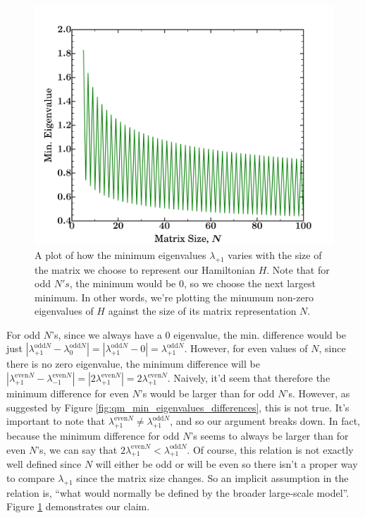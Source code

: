 \documentclass{amsproc}
\theoremstyle{definition}
\theoremstyle{remark}
\numberwithin{equation}{section}
\begin{document}
\begin{figure}
\includegraphics[width=\columnwidth]{figures/qm_min_eigenvalues.pdf}
\caption{A plot of how the minimum eigenvalues $\lambda_{+1}$ varies with the size of the matrix we choose to represent our Hamiltonian $H$. Note that for odd $N's$, the minimum would be $0$, so we choose the next largest minimum. In other words, we're plotting the minumum non-zero eigenvalues of $H$ against the size of its matrix representation $N$. }
\label{fig:qm_min_eigenvalues}
\end{figure}

For odd $N$'s, since we always have a $0$ eigenvalue, the min. difference would be just $\left| \lambda_{+1}^{\mathrm{odd}N} - \lambda_0^{\mathrm{odd}N} \right| = \left| \lambda_{+1}^{\mathrm{odd}N} - 0 \right| = \lambda_{+1}^{\mathrm{odd}N} $. However, for even values of $N$, since there is no zero eigenvalue, the minimum difference will be $\left| \lambda_{+1}^{\mathrm{even}N} - \lambda_{-1}^{\mathrm{even}N} \right| = \left|2 \lambda_{+1}^{\mathrm{even}N} \right| = 2 \lambda_{+1}^{\mathrm{even}N} $. Naively, it'd seem that therefore the minimum difference for even $N$'s would be larger than for odd $N$'s. However, as suggested by Figure \ref{fig:qm_min_eigenvalues_differences}, this is not true. It's important to note that $\lambda_{+1}^{\mathrm{even}N} \ne \lambda_{+1}^{\mathrm{odd}N}$, and so our argument breaks down. In fact, because the minimum  difference for odd $N$'s seems to always be larger than for even $N$'s, we can say that $ 2 \lambda_{+1}^{\mathrm{even}N} < \lambda_{+1}^{\mathrm{odd}N}$. Of course, this relation is not exactly well defined since $N$ will either be odd or will be even so there isn't a proper way to compare $\lambda_{+1}$ since the matrix size changes. So an implicit assumption in the relation is, ``what would normally be defined by the broader large-scale model''. Figure \ref{fig:qm_min_eigenvalues} demonstrates our claim.
\end{document}
